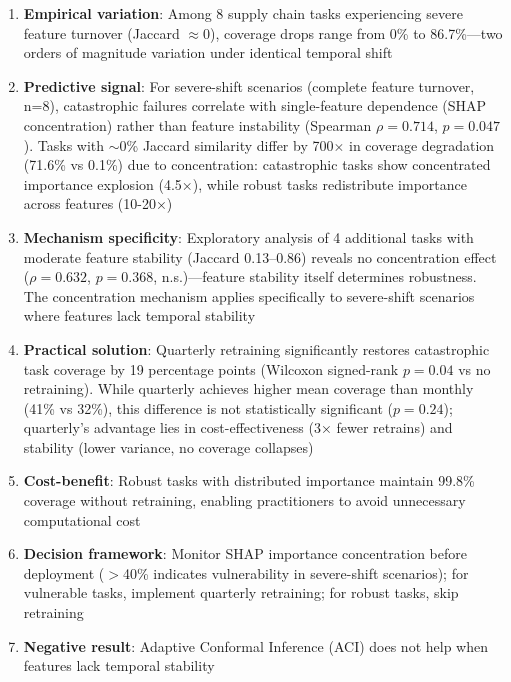 \documentclass[sigconf]{acmart}
\begin{document}
\begin{enumerate}
    \item \textbf{Empirical variation}: Among 8 supply chain tasks experiencing severe feature turnover (Jaccard $\approx$0), coverage drops range from 0\% to 86.7\%---two orders of magnitude variation under identical temporal shift

    \item \textbf{Predictive signal}: For severe-shift scenarios (complete feature turnover, n=8), catastrophic failures correlate with single-feature dependence (SHAP concentration) rather than feature instability (Spearman $\rho=0.714$, $p=0.047$). Tasks with $\sim$0\% Jaccard similarity differ by 700$\times$ in coverage degradation (71.6\% vs 0.1\%) due to concentration: catastrophic tasks show concentrated importance explosion (4.5×), while robust tasks redistribute importance across features (10-20×)

    \item \textbf{Mechanism specificity}: Exploratory analysis of 4 additional tasks with moderate feature stability (Jaccard 0.13--0.86) reveals no concentration effect ($\rho=0.632$, $p=0.368$, n.s.)---feature stability itself determines robustness. The concentration mechanism applies specifically to severe-shift scenarios where features lack temporal stability

    \item \textbf{Practical solution}: Quarterly retraining significantly restores catastrophic task coverage by 19 percentage points (Wilcoxon signed-rank $p=0.04$ vs no retraining). While quarterly achieves higher mean coverage than monthly (41\% vs 32\%), this difference is not statistically significant ($p=0.24$); quarterly's advantage lies in cost-effectiveness (3× fewer retrains) and stability (lower variance, no coverage collapses)

    \item \textbf{Cost-benefit}: Robust tasks with distributed importance maintain 99.8\% coverage without retraining, enabling practitioners to avoid unnecessary computational cost

    \item \textbf{Decision framework}: Monitor SHAP importance concentration before deployment ($>$40\% indicates vulnerability in severe-shift scenarios); for vulnerable tasks, implement quarterly retraining; for robust tasks, skip retraining

    \item \textbf{Negative result}: Adaptive Conformal Inference (ACI) does not help when features lack temporal stability
\end{enumerate}
\end{document}
